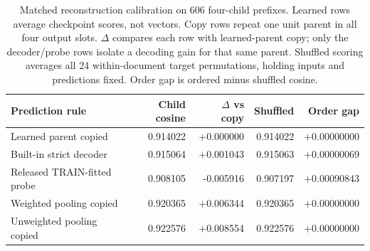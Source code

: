 \begin{table}[H]
\caption{Matched reconstruction calibration on 606 four-child prefixes. Learned rows average checkpoint scores, not vectors. Copy rows repeat one unit parent in all four output slots. $\Delta$ compares each row with learned-parent copy; only the decoder/probe rows isolate a decoding gain for that same parent. Shuffled scoring averages all 24 within-document target permutations, holding inputs and predictions fixed. Order gap is ordered minus shuffled cosine.}
\label{tab:reconstruction-calibration}
\centering\small
\begin{tabularx}{\linewidth}{Yrrrr}
\toprule
Prediction rule & Child cosine & $\Delta$ vs copy & Shuffled & Order gap \\
\midrule
Learned parent copied & 0.914022 & +0.000000 & 0.914022 & +0.00000000 \\
Built-in strict decoder & 0.915064 & +0.001043 & 0.915063 & +0.00000069 \\
Released TRAIN-fitted probe & 0.908105 & -0.005916 & 0.907197 & +0.00090843 \\
Weighted pooling copied & 0.920365 & +0.006344 & 0.920365 & +0.00000000 \\
Unweighted pooling copied & 0.922576 & +0.008554 & 0.922576 & +0.00000000 \\
\bottomrule
\end{tabularx}
\end{table}
